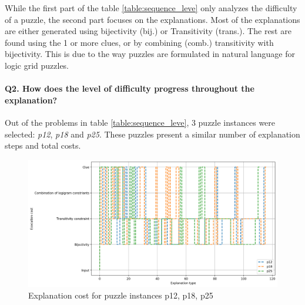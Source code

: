 While the first part of the table \ref{table:sequence_leve} only analyzes the difficulty of a puzzle, the second part focuses on the explanations. 
Most of the explanations are either generated using bijectivity (bij.) or Transitivity (trans.). The rest are found using the 1 or more clues, or by combining (comb.) transitivity with bijectivity. This is due to the way puzzles are formulated in natural language for logic grid puzzles.

\paragraph{Q2. How does the level of difficulty progress throughout the explanation?} Out of the problems in table \ref{table:sequence_leve}, 3 puzzle instances were selected: \textit{p12}, \textit{p18} and \textit{p25}. These puzzles present a similar number of explanation steps and total costs.

\begin{figure}
	\centering
	\includegraphics[width=0.7\linewidth]{figures/plot_cost_steps.png}
		\caption{Explanation cost for puzzle instances p12, p18, p25}
			\label{fig:plotcoststeps}
\end{figure}

